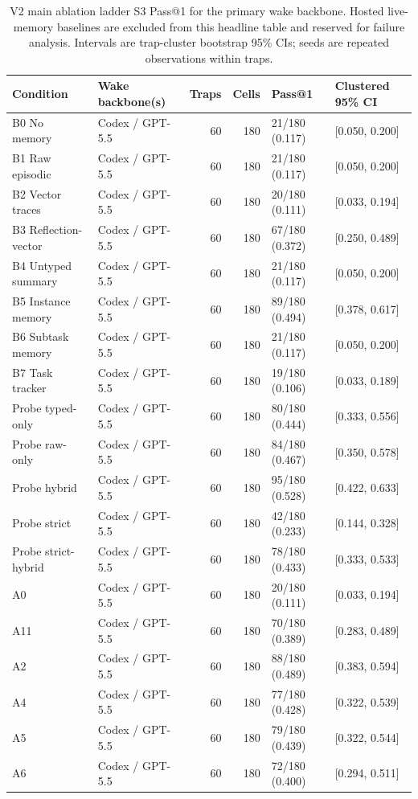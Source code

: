 
\begin{table}[t]
\centering
\small
\begin{tabular}{llrrll}
\toprule
Condition & Wake backbone(s) & Traps & Cells & Pass@1 & Clustered 95\% CI \\
\midrule
B0 No memory & Codex / GPT-5.5 & 60 & 180 & 21/180 (0.117) & [0.050, 0.200] \\
B1 Raw episodic & Codex / GPT-5.5 & 60 & 180 & 21/180 (0.117) & [0.050, 0.200] \\
B2 Vector traces & Codex / GPT-5.5 & 60 & 180 & 20/180 (0.111) & [0.033, 0.194] \\
B3 Reflection-vector & Codex / GPT-5.5 & 60 & 180 & 67/180 (0.372) & [0.250, 0.489] \\
B4 Untyped summary & Codex / GPT-5.5 & 60 & 180 & 21/180 (0.117) & [0.050, 0.200] \\
B5 Instance memory & Codex / GPT-5.5 & 60 & 180 & 89/180 (0.494) & [0.378, 0.617] \\
B6 Subtask memory & Codex / GPT-5.5 & 60 & 180 & 21/180 (0.117) & [0.050, 0.200] \\
B7 Task tracker & Codex / GPT-5.5 & 60 & 180 & 19/180 (0.106) & [0.033, 0.189] \\
Probe typed-only & Codex / GPT-5.5 & 60 & 180 & 80/180 (0.444) & [0.333, 0.556] \\
Probe raw-only & Codex / GPT-5.5 & 60 & 180 & 84/180 (0.467) & [0.350, 0.578] \\
Probe hybrid & Codex / GPT-5.5 & 60 & 180 & 95/180 (0.528) & [0.422, 0.633] \\
Probe strict & Codex / GPT-5.5 & 60 & 180 & 42/180 (0.233) & [0.144, 0.328] \\
Probe strict-hybrid & Codex / GPT-5.5 & 60 & 180 & 78/180 (0.433) & [0.333, 0.533] \\
A0 & Codex / GPT-5.5 & 60 & 180 & 20/180 (0.111) & [0.033, 0.194] \\
A11 & Codex / GPT-5.5 & 60 & 180 & 70/180 (0.389) & [0.283, 0.489] \\
A2 & Codex / GPT-5.5 & 60 & 180 & 88/180 (0.489) & [0.383, 0.594] \\
A4 & Codex / GPT-5.5 & 60 & 180 & 77/180 (0.428) & [0.322, 0.539] \\
A5 & Codex / GPT-5.5 & 60 & 180 & 79/180 (0.439) & [0.322, 0.544] \\
A6 & Codex / GPT-5.5 & 60 & 180 & 72/180 (0.400) & [0.294, 0.511] \\
\bottomrule
\end{tabular}
\caption{V2 main ablation ladder S3 Pass@1 for the primary wake backbone. Hosted live-memory baselines are excluded from this headline table and reserved for failure analysis. Intervals are trap-cluster bootstrap 95\% CIs; seeds are repeated observations within traps.}
\label{tab:v2-main-ladder}
\end{table}

